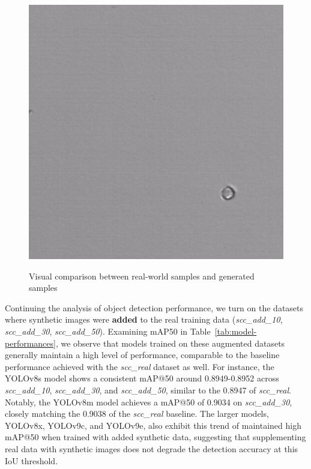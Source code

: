 \begin{figure}
\begin{minipage}[b]{0.49\textwidth}
{\begin{minipage}[t]{0.45\linewidth}
                \includegraphics[width=\linewidth]{images/sample_00870_40_png.rf.7c55b5f72263d273e38102bf8a0db76a}
                \label{fig:gen2}
            \end{minipage}
        }
    \end{minipage}
    \caption{Visual comparison between real-world samples  and generated samples }
    \label{fig:comparison}
\end{figure}
Continuing the analysis of object detection performance, we turn on the datasets where synthetic images were \textbf{added} to the real training data (\textit{scc\_add\_10}, \textit{scc\_add\_30}, \textit{scc\_add\_50}).
Examining mAP\@50 in Table~\ref{tab:model-performances}, we observe that models trained on these augmented datasets generally maintain a high level of performance, comparable to the baseline performance achieved with the \textit{scc\_real} dataset as well.
For instance, the YOLOv8s model shows a consistent mAP@50 around 0.8949-0.8952 across \textit{scc\_add\_10}, \textit{scc\_add\_30}, and \textit{scc\_add\_50}, similar to the 0.8947 of \textit{scc\_real}.
Notably, the YOLOv8m model achieves a mAP@50 of 0.9034 on \textit{scc\_add\_30}, closely matching the 0.9038 of the \textit{scc\_real} baseline.
The larger models, YOLOv8x, YOLOv9c, and YOLOv9e, also exhibit this trend of maintained high mAP@50 when trained with added synthetic data, suggesting that supplementing real data with synthetic images does not degrade the detection accuracy at this IoU threshold.

